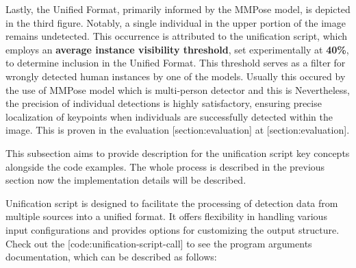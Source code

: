 Lastly, the Unified Format, primarily informed by the MMPose model, is depicted in the third figure. Notably, a single individual in the upper portion of the image remains undetected. This occurrence is attributed to the unification script, which employs an {\bf average instance visibility threshold}, set experimentally at {\bf 40\%}, to determine inclusion in the Unified Format. This threshold serves as a filter for wrongly detected human instances by one of the models. Usually this occured by the use of MMPose model which is multi-person detector and this is Nevertheless, the precision of individual detections is highly satisfactory, ensuring precise localization of keypoints when individuals are successfully detected within the image. This is proven in the evaluation [section:evaluation] at [section:evaluation].

This subsection aims to provide description for the unification script key concepts alongside the code examples. The whole process is described in the previous section now the implementation details will be described.


Unification script is designed to facilitate the processing of detection data from multiple sources into a unified format. It offers flexibility in handling various input configurations and provides options for customizing the output structure. Check out the [code:unification-script-call] to see the program arguments documentation, which can be described as follows:


